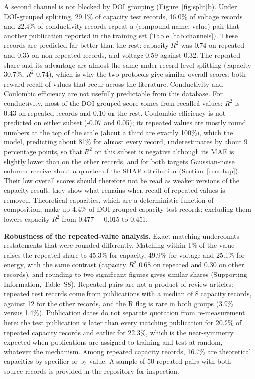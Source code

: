 \documentclass[journal=jcisd8,manuscript=article,layout=traditional]{achemso}
\begin{document}
A second channel is not blocked by DOI grouping (Figure~\ref{fig:split}b). Under DOI-grouped splitting, 29.1\% of capacity test records, 46.0\% of voltage records and 22.4\% of conductivity records repeat a (compound name, value) pair that another publication reported in the training set (Table~\ref{tab:channels}). These records are predicted far better than the rest: capacity $R^2$ was 0.74 on repeated and 0.35 on non-repeated records, and voltage 0.59 against 0.32. The repeated share and its advantage are almost the same under record-level splitting (capacity 30.7\%, $R^2$ 0.74), which is why the two protocols give similar overall scores: both reward recall of values that recur across the literature. Conductivity and Coulombic efficiency are not usefully predictable from this database. For conductivity, most of the DOI-grouped score comes from recalled values: $R^2$ is 0.43 on repeated records and 0.10 on the rest. Coulombic efficiency is not predicted on either subset (-0.07 and 0.05); its repeated values are mostly round numbers at the top of the scale (about a third are exactly 100\%), which the model, predicting about 81\% for almost every record, underestimates by about 9 percentage points, so that $R^2$ on this subset is negative although its MAE is slightly lower than on the other records, and for both targets Gaussian-noise columns receive about a quarter of the SHAP attribution (Section~\ref{sec:shap}). Their low overall scores should therefore not be read as weaker versions of the capacity result; they show what remains when recall of repeated values is removed. Theoretical capacities, which are a deterministic function of composition, make up 4.4\% of DOI-grouped capacity test records; excluding them lowers capacity $R^2$ from 0.477 $\pm$ 0.015 to 0.451.

\textbf{Robustness of the repeated-value analysis.} Exact matching undercounts restatements that were rounded differently. Matching within 1\% of the value raises the repeated share to 45.3\% for capacity, 49.9\% for voltage and 25.1\% for energy, with the same contrast (capacity $R^2$ 0.68 on repeated and 0.30 on other records), and rounding to two significant figures gives similar shares (Supporting Information, Table~S8). Repeated pairs are not a product of review articles: repeated test records come from publications with a median of 8 capacity records, against 12 for the other records, and the R flag is rare in both groups (3.9\% versus 1.4\%). Publication dates do not separate quotation from re-measurement here: the test publication is later than every matching publication for 20.2\% of repeated capacity records and earlier for 22.3\%, which is the near-symmetry expected when publications are assigned to training and test at random, whatever the mechanism. Among repeated capacity records, 16.7\% are theoretical capacities by specifier or by value. A sample of 50 repeated pairs with both source records is provided in the repository for inspection.
\end{document}
